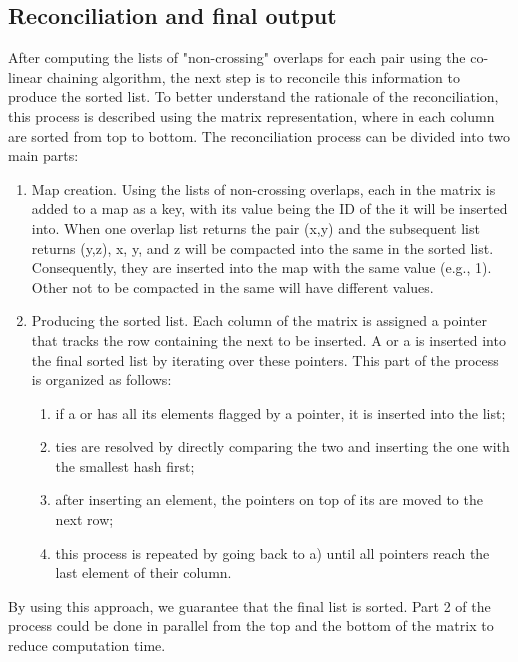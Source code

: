 \subsection{Reconciliation and final output}
\label{sec:reconciliation}
After computing the lists of "non-crossing" overlaps for each pair using the co-linear chaining algorithm, the next step is to reconcile this information to produce the sorted list. To better understand the rationale of the reconciliation, this process is described using the matrix representation, where \kmers in each column are sorted from top to bottom. The reconciliation process can be divided into two main parts:
\begin{enumerate}
	\item Map creation. Using the lists of non-crossing overlaps, each \kmer in the matrix is added to a map as a key, with its value being the ID of the \skmer it will be inserted into. When one overlap list returns the pair (x,y) and the subsequent list returns (y,z), \kmers x, y, and z will be compacted into the same \skmer in the sorted list. Consequently, they are inserted into the map with the same value (e.g., 1). Other \skmers not to be compacted in the same \skmer will have different values.
	\item Producing the sorted list. Each column of the matrix is assigned a pointer that tracks the row containing the next \kmer to be inserted. A \kmer or a \skmer is inserted into the final sorted list by iterating over these pointers. This part of the process is organized as follows:
	\begin{enumerate}
	\item if a \kmer or \skmer has all its elements flagged by a pointer, it is inserted into the list;
	\item ties are resolved by directly comparing the two \skmers and inserting the one with the smallest hash first;
	\item after inserting an element, the pointers on top of its \kmers are moved to the next row;
	\item this process is repeated by going back to a) until all pointers reach the last element of their column.
	\end{enumerate}
\end{enumerate}
By using this approach, we guarantee that the final list is sorted. Part 2 of the process could be done in parallel from the top and the bottom of the matrix to reduce computation time.

